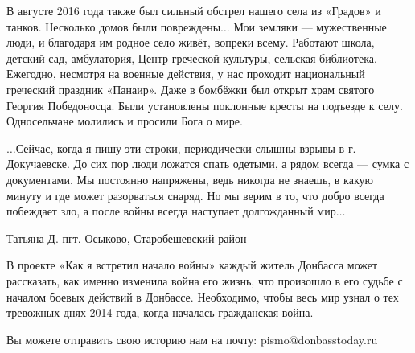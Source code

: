 В августе 2016 года также был сильный обстрел нашего села из «Градов» и танков.
Несколько домов были повреждены$\ldots$ Мои земляки --- мужественные люди, и благодаря
им родное село живёт, вопреки всему. Работают школа, детский сад, амбулатория,
Центр греческой культуры, сельская библиотека. Ежегодно, несмотря на военные
действия, у нас проходит национальный греческий праздник «Панаир». Даже в
бомбёжки был открыт храм святого Георгия Победоносца. Были установлены
поклонные кресты на подъезде к селу. Односельчане молились и просили Бога о
мире.

$\ldots$Сейчас, когда я пишу эти строки, периодически слышны взрывы в г. Докучаевске.
До сих пор люди ложатся спать одетыми, а рядом всегда --- сумка с документами. Мы
постоянно напряжены, ведь никогда не знаешь, в какую минуту и где может
разорваться снаряд. Но мы верим в то, что добро всегда побеждает зло, а после
войны всегда наступает долгожданный мир$\ldots$

Татьяна Д. пгт. Осыково, Старобешевский район

В проекте «Как я встретил начало войны» каждый житель Донбасса может
рассказать, как именно изменила война его жизнь, что произошло в его судьбе с
началом боевых действий в Донбассе. Необходимо, чтобы весь мир узнал о тех
тревожных днях 2014 года, когда началась гражданская война.

Вы можете отправить свою историю нам на почту: pismo@donbasstoday.ru
